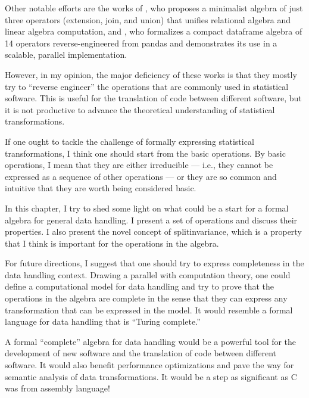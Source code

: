 Other notable efforts are the works of
\textcite{hutchison2017laradb}, who proposes a
minimalist algebra of just three operators (extension, join, and union) that unifies
relational algebra and linear algebra computation, and
\textcite{petersohn2020towards}, who formalizes a
compact dataframe algebra of 14 operators reverse-engineered from pandas and demonstrates
its use in a scalable, parallel implementation.

However, in my opinion, the major deficiency of these works is that they mostly try to
``reverse engineer'' the operations that are commonly used in statistical software.  This
is useful for the translation of code between different software, but it is not productive
to advance the theoretical understanding of statistical transformations.

If one ought to tackle the challenge of formally expressing statistical transformations, I
think one should start from the basic operations.  By basic operations, I mean that they
are either irreducible --- i.e., they cannot be expressed as a sequence of other
operations --- or they are so common and intuitive that they are worth being considered
basic.

In this chapter, I try to shed some light on what could be a start for a formal algebra
for general data handling.  I present a set of operations and discuss their properties. I
also present the novel concept of \gls{splitinvariance}, which is a property that I think is
important for the operations in the algebra.

For future directions, I suggest that one should try to express completeness in the data
handling context.  Drawing a parallel with computation theory, one could define a
computational model for data handling and try to prove that the operations in the algebra
are complete in the sense that they can express any transformation that can be expressed
in the model.  It would resemble a formal language for data handling that is ``Turing
complete.''

A formal ``complete'' algebra for data handling would be a powerful tool for the
development of new software and the translation of code between different software.  It
would also benefit performance optimizations and pave the way for semantic analysis of
data transformations.  It would be a step as significant as C was from assembly language!

